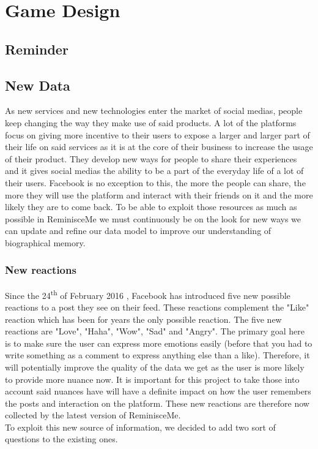 \chapter{Game Design}
\section{Reminder}
\section{New Data}
As new services and new technologies enter the market of social medias, people keep changing the way they make use of said products. A lot of the platforms focus on giving more incentive to their users to expose a larger and larger part of their life on said services as it is at the core of their business to increase the usage of their product. They develop new ways for people to share their experiences and it gives social medias the ability to be a part of the everyday life of a lot of their users. Facebook is no exception to this, the more the people can share, the more they will use the platform and interact with their friends on it and the more likely they are to come back. To be able to exploit those resources as much as possible in ReminisceMe we must continuously be on the look for new ways we can update and refine our data model to improve our understanding of biographical memory.
\subsection{New reactions}
Since the 24\textsuperscript{th} of February 2016 \cite{reactrelease}, Facebook has introduced five new possible reactions to a post they see on their feed. These reactions complement the "Like" reaction which has been for years the only possible reaction. The five new reactions are "Love", "Haha", "Wow", "Sad" and "Angry". The primary goal here is to make sure the user can express more emotions easily (before that you had to write something as a comment to express anything else than  a like). Therefore, it will potentially improve the quality of the data we get as the user is more likely to provide more nuance now. It is important for this project to take those into account said nuances have will have a definite impact on how the user remembers the posts and interaction on the platform. These new reactions are therefore now collected by the latest version of ReminisceMe.\\
To exploit this new source of information, we decided to add two sort of questions to the existing ones.
